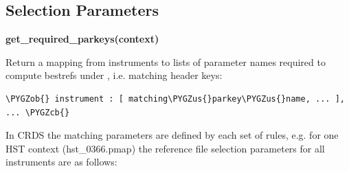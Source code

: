 \documentclass[letterpaper,10pt,english]{sphinxmanual}
\def\PYGZus{\char`\_}
\def\PYGZob{\char`\{}
\def\PYGZcb{\char`\}}
\begin{document}
\subsection{Selection Parameters}
\label{web_services:selection-parameters}
\textbf{get\_required\_parkeys(context)}

Return a mapping from instruments to lists of parameter names required to
compute bestrefs under ,  i.e. matching header keys:

\begin{Verbatim}[commandchars=\\\{\}]
\PYGZob{} instrument : [ matching\PYGZus{}parkey\PYGZus{}name, ... ], ... \PYGZcb{}
\end{Verbatim}

In CRDS the matching parameters are defined by each set of rules, e.g. for
one HST context (hst\_0366.pmap) the reference file selection parameters
for all instruments are as follows:
\end{document}
